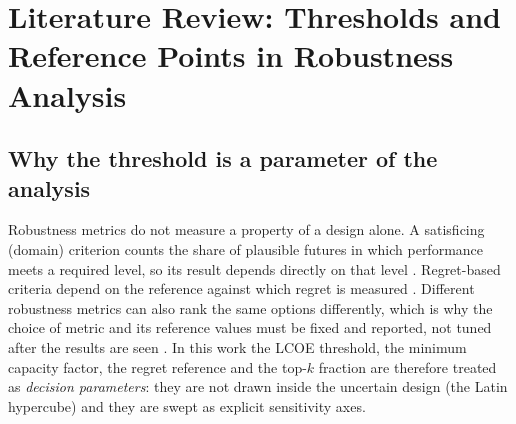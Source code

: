 
\section{Literature Review: Thresholds and Reference Points in Robustness Analysis}
\label{sec:g4-lit}

\subsection{Why the threshold is a parameter of the analysis}
Robustness metrics do not measure a property of a design alone. A satisficing (domain) criterion counts the share of plausible futures in which performance meets a required level, so its result depends directly on that level \citep{herman2015,mcphail2018}. Regret-based criteria depend on the reference against which regret is measured \citep{savage1951,lempert2006}. Different robustness metrics can also rank the same options differently, which is why the choice of metric and its reference values must be fixed and reported, not tuned after the results are seen \citep{mcphail2018}. In this work the LCOE threshold, the minimum capacity factor, the regret reference and the top-$k$ fraction are therefore treated as \emph{decision parameters}: they are not drawn inside the uncertain design (the Latin hypercube) and they are swept as explicit sensitivity axes.

